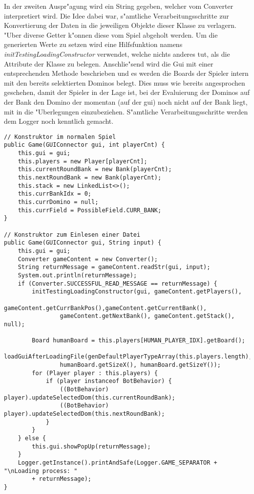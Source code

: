 In der zweiten Auspr"agung wird ein String gegeben, welcher vom Converter interpretiert wird. Die Idee dabei war, s"amtliche Verarbeitungsschritte zur Konvertierung der Daten in die jeweiligen Objekte dieser Klasse zu verlagern. "Uber diverse Getter k"onnen diese vom Spiel \grqq abgeholt\glqq {} werden. Um die generierten Werte zu setzen wird eine Hilfsfunktion namens \emph{initTestingLoadingConstructor} verwendet, welche nichts anderes tut, als die Attribute der Klasse zu belegen. Anschlie"send wird die Gui mit einer entsprechenden Methode beschrieben und es werden die Boards der Spieler intern mit den bereits selektierten Dominos belegt. Dies muss wie bereits angesprochen geschehen, damit der Spieler in der Lage ist, bei der Evaluierung der Dominos auf der Bank den Domino der momentan (auf der gui) noch nicht auf der Bank liegt, mit in die "Uberlegungen einzubeziehen. 
S"amtliche Verarbeitungsschritte werden dem Logger noch kenntlich gemacht. 
\begin{lstlisting}[float,style=CodeHighlighting,caption=Game - Konstruktoren,label=lst:game_konstruktor]
// Konstruktor im normalen Spiel
public Game(GUIConnector gui, int playerCnt) {
    this.gui = gui;
    this.players = new Player[playerCnt];
    this.currentRoundBank = new Bank(playerCnt);
    this.nextRoundBank = new Bank(playerCnt);
    this.stack = new LinkedList<>();
    this.currBankIdx = 0;
    this.currDomino = null;
    this.currField = PossibleField.CURR_BANK;
}

// Konstruktor zum Einlesen einer Datei
public Game(GUIConnector gui, String input) {
    this.gui = gui;
    Converter gameContent = new Converter();
    String returnMessage = gameContent.readStr(gui, input);
    System.out.println(returnMessage);
    if (Converter.SUCCESSFUL_READ_MESSAGE == returnMessage) {
        initTestingLoadingConstructor(gui, gameContent.getPlayers(),
        		gameContent.getCurrBankPos(),gameContent.getCurrentBank(),
                gameContent.getNextBank(), gameContent.getStack(), null);

        Board humanBoard = this.players[HUMAN_PLAYER_IDX].getBoard();
        loadGuiAfterLoadingFile(genDefaultPlayerTypeArray(this.players.length),
        		humanBoard.getSizeX(), humanBoard.getSizeY());
        for (Player player : this.players) {
            if (player instanceof BotBehavior) {
                ((BotBehavior) player).updateSelectedDom(this.currentRoundBank);
                ((BotBehavior) player).updateSelectedDom(this.nextRoundBank);
            }
        }
    } else {
        this.gui.showPopUp(returnMessage);
    }
    Logger.getInstance().printAndSafe(Logger.GAME_SEPARATOR + "\nLoading process: " 
    	+ returnMessage);
}
\end{lstlisting}

